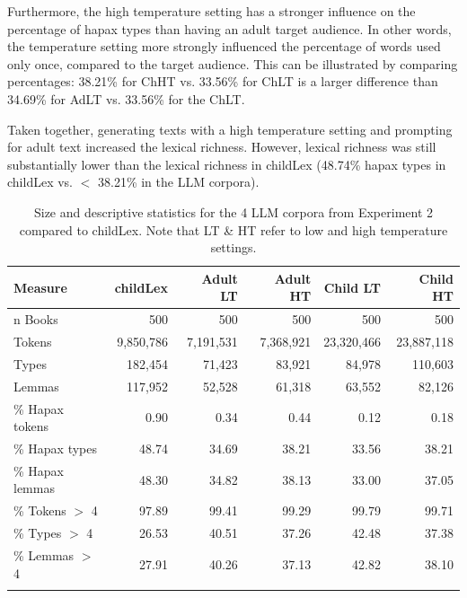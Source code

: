 \documentclass[doc, a4paper, anonymous]{apa7}
\begin{document}
Furthermore, the high temperature setting has a stronger influence on the percentage of hapax types than having an adult target audience. In other words, the temperature setting more strongly influenced the percentage of words used only once, compared to the target audience. This can be illustrated by comparing percentages: 38.21\% for ChHT vs. 33.56\% for ChLT is a larger difference than 34.69\% for AdLT vs. 33.56\% for the ChLT. 

Taken together, generating texts with a high temperature setting and prompting for adult text increased the lexical richness. However, lexical richness was still substantially lower than the lexical richness in childLex (48.74\% hapax types in childLex vs. $<$ 38.21\% in the LLM corpora). 

\begin{table}[!htbp]
\caption{Size and descriptive statistics for the 4 LLM corpora from Experiment 2 compared to childLex. Note that LT \& HT refer to low and high temperature settings.}
\centering
\begin{tabular}{lrrrrr}
  \hline
    Measure & childLex & Adult LT & Adult HT & Child LT & Child HT \\ 
  \hline
n Books & 500 & 500 & 500 & 500 & 500 \\ 
  Tokens & 9,850,786 & 7,191,531 & 7,368,921 & 23,320,466 & 23,887,118 \\ 
  Types & 182,454 & 71,423 & 83,921 & 84,978 & 110,603 \\ 
  Lemmas & 117,952 & 52,528 & 61,318 & 63,552 & 82,126 \\ 
  \% Hapax tokens & 0.90 & 0.34 & 0.44 & 0.12 & 0.18 \\ 
  \% Hapax types & 48.74 & 34.69 & 38.21 & 33.56 & 38.21 \\ 
  \% Hapax lemmas & 48.30 & 34.82 & 38.13 & 33.00 & 37.05 \\ 
  \% Tokens $>$ 4 & 97.89 & 99.41 & 99.29 & 99.79 & 99.71 \\ 
  \% Types $>$ 4 & 26.53 & 40.51 & 37.26 & 42.48 & 37.38 \\ 
  \% Lemmas $>$ 4 & 27.91 & 40.26 & 37.13 & 42.82 & 38.10 \\ 
   \hline \\
\end{tabular}
\label{freqComp2}
\end{table}
\end{document}
